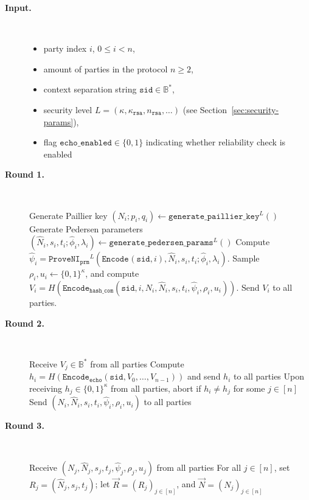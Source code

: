 \documentclass[11pt]{article}
\newcommand{\sid}{\ensuremath{\mathtt{sid}}}
\newcommand{\fn}[1]{\ensuremath{\mathtt{#1}}}
\newcommand{\var}[1]{\ensuremath{\mathtt{#1}}}
\newcommand{\rsa}{\ensuremath{\mathtt{rsa}}}
\newcommand{\proveni}[1]{\ensuremath{\mathtt{ProveNI}_{\mathtt{#1}}}}
\newcommand{\Encode}[1][]{\ensuremath{\mathtt{Encode}_{\mathtt{#1}}}}
\newcommand{\?}[1]{\stackrel{?}{#1}}
\newcommand{\Bit}{\ensuremath{\{0{,}1\}}}
\newcommand{\Byte}{\ensuremath{\mathbb{B}}}
\begin{document}
\begin{description}
    \item[\textbf{Input.}] \
    \begin{itemize}[noitemsep,topsep=0pt]
    \item party index $i$, $0 \le i < n$,
    \item amount of parties in the protocol $n \ge 2$,
    \item context separation string $\sid \in \Byte^*$,
    \item security level $L = (\kappa, \kappa_\rsa, n_\rsa, \dots)$ (see Section~\ref{sec:security-params}),
    \item flag $\var{echo\_enabled} \in \Bit$ indicating whether reliability check is enabled
    \end{itemize}

    \item[\textbf{Round 1.}] \
    \begin{algorithmic}[1]
        \State Generate Paillier key $(N_i; p_i, q_i) \gets \fn{generate\_paillier\_key}^L()$
        \State Generate Pedersen parameters $(\hat N_i, s_i, t_i; \hat \phi_i, \lambda_i) \gets \fn{generate\_pedersen\_params}^L()$
        \State Compute $\hat{\psi}_i = \proveni{prm}^L(\Encode(\sid, i), \hat N_i, s_i, t_i; \hat \phi_i, \lambda_i)$.
        \State Sample $\rho_i, u_i \leftarrow \Bit^\kappa$, 
        and compute $V_i =
        H(\Encode[hash\_com](\sid, i, N_i, \hat N_i, s_i, t_i, \hat{\psi}_i, \rho_i, u_i))$.
        \State Send $V_i$ to all parties.
    \end{algorithmic}
    

    \item[\textbf{Round 2.}] \
    \begin{algorithmic}[1]
        \State Receive $V_j \in \Byte^*$ from all parties
        \If{$\var{echo\_enabled}$} 
            \State Compute $h_i = H(\Encode[echo](\sid, V_0, \dots, V_{n-1}))$ and 
            send $h_i$ to all parties
            \State Upon receiving $h_j \in \Bit^\kappa$ from all parties, abort if $h_i \neq h_j$ for some $j \in [n]$
        \EndIf
        \State Send $(N_i, \hat N_i, s_i, t_i, \hat{\psi}_i, \rho_i, u_i)$ to all parties
    \end{algorithmic}

    \item[\textbf{Round 3.}] \

    \begin{algorithmic}[1]
        \State Receive $(N_j, \hat N_j, s_j, t_j, \hat{\psi}_j, \rho_j, u_j)$
        from all parties
        \State For all $j \in [n]$, set $R_j = (\hat N_j, s_j, t_j)$; let
        $\vec{R} = (R_j)_{j \in [n]}$, and $\vec N = (N_j)_{j \in [n]}$


\end{algorithmic}
\end{description}
\end{document}
